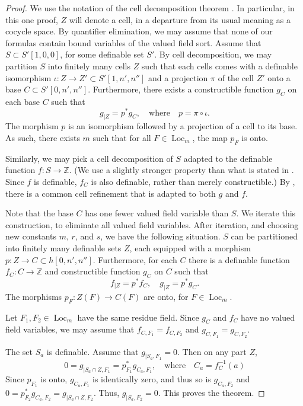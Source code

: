 \documentclass[12pt]{amsart}
\newcommand{\op}[1]{\operatorname{#1}}
\newcommand{\ring}[1]{{\mathbb #1}}
\theoremstyle{plain}
\theoremstyle{definition}
\begin{document}
\begin{proof} We use the notation of the cell decomposition theorem
  \cite[Theorem 7.2.1]{CL}.  In particular, in this one proof, $Z$
  will denote a cell, in a departure from its usual meaning as a
  cocycle space.  By quantifier elimination, we may assume that none
  of our formulas contain bound variables of the valued field sort.
  Assume that $S\subset S'[1,0,0]$, for some definable set $S'$.  By
  cell decomposition, we may partition $S$ into finitely many cells
  $Z$ such that each cells comes with a definable isomorphism
  $\iota:Z \to Z'\subset S'[1,n',n'']$ and a projection $\pi$ of the
  cell $Z'$ onto a base $C\subset S'[0,n',n'']$.  Furthermore, there
  exists a constructible function $g_C$ on each base $C$ such that
\[
g_{|Z} = p^* g_C, \quad\text{where}\quad p = \pi\circ\iota.
\]
The morphism $p$ is an isomorphism followed by a
projection of a cell to its base.  As such, there exists $m$ such that
for all $F\in \op{Loc}_m$, the map $p_F$ is onto.

Similarly, we may pick a cell decomposition of $S$ adapted to the
definable function $f:S\to \ring{Z}$.  (We use a slightly stronger
property than what is stated in \cite{CL}.  Since $f$ is definable,
$f_C$ is also definable, rather than merely constructible.)  By
\cite[Prop 7.3.2]{CL}, there is a common cell refinement that is
adapted to both $g$ and $f$.

Note that the base $C$ has one fewer valued field variable than $S$.
We iterate this construction, to eliminate all valued field variables.
After iteration, and choosing new constants $m$, $r$, and $s$, we
have the following situation.  $S$ can be partitioned into finitely
many definable sets $Z$, each equipped with a morphism $p:Z\to
C\subset h[0,n',n'']$.  Furthermore, for each $C$ there is a definable
function $f_C:C\to\ring{Z}$ and constructible function $g_C$ on $C$
such that
\[
f_{|Z} = p^* f_C,\quad  g_{|Z} = p^* g_C.
\]
The morphisms $p_F:Z(F)\to C(F)$ are onto, for $F\in\op{Loc}_m$.

Let $F_1,F_2\in\op{Loc}_m$ have the same residue field.  Since $g_C$ and
$f_C$ have no valued field variables, we may assume that $f_{C,F_1} =
f_{C,F_2}$ and $g_{C,F_1} = g_{C,F_2}$.

The set $S_a$ is definable.  Assume that $g_{|S_a,F_1} = 0$.  Then on
any part $Z$,
\[
0 = g_{|S_a\cap Z,F_1} = p^*_{F_1} g_{C_a,F_1}, \quad\text{where}\quad C_a = f_C^{-1}(a)
\]
Since $p_{F_1}$ is onto, $g_{C_a,F_1}$ is identically zero, and thus so is
$g_{C_a,F_2}$ and $0 = p^*_{F_2} g_{C_a,F_2} = g_{|S_a\cap Z,F_2}$.  Thus,
$g_{|S_a,F_2}=0$.  This proves the theorem.
\end{proof}
\end{document}
